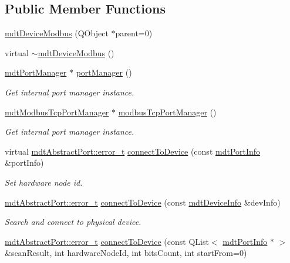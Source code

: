 \subsection*{Public Member Functions}
\begin{DoxyCompactItemize}
\item 
\hyperlink{classmdt_device_modbus_ac69cfbe26681342ba05672ab63de2a1f}{mdt\-Device\-Modbus} (Q\-Object $\ast$parent=0)
\item 
virtual \hyperlink{classmdt_device_modbus_a4696f2e3855917a3e3c02a822f9664e2}{$\sim$mdt\-Device\-Modbus} ()
\item 
\hyperlink{classmdt_port_manager}{mdt\-Port\-Manager} $\ast$ \hyperlink{classmdt_device_modbus_aed892b501f8cbd372ccfda1a4fafa536}{port\-Manager} ()
\begin{DoxyCompactList}\small\item\em Get internal port manager instance. \end{DoxyCompactList}\item 
\hyperlink{classmdt_modbus_tcp_port_manager}{mdt\-Modbus\-Tcp\-Port\-Manager} $\ast$ \hyperlink{classmdt_device_modbus_ac547788aa95d46c00ddb1342eb46ef93}{modbus\-Tcp\-Port\-Manager} ()
\begin{DoxyCompactList}\small\item\em Get internal port manager instance. \end{DoxyCompactList}\item 
virtual \hyperlink{classmdt_abstract_port_ad4121bb930c95887e77f8bafa065a85e}{mdt\-Abstract\-Port\-::error\-\_\-t} \hyperlink{classmdt_device_modbus_a3ca2a84163fed1380cbc8859a6b70db0}{connect\-To\-Device} (const \hyperlink{classmdt_port_info}{mdt\-Port\-Info} \&port\-Info)
\begin{DoxyCompactList}\small\item\em Set hardware node id. \end{DoxyCompactList}\item 
\hyperlink{classmdt_abstract_port_ad4121bb930c95887e77f8bafa065a85e}{mdt\-Abstract\-Port\-::error\-\_\-t} \hyperlink{classmdt_device_modbus_a093c6407ee69c4c7696a0c71d0acd88d}{connect\-To\-Device} (const \hyperlink{classmdt_device_info}{mdt\-Device\-Info} \&dev\-Info)
\begin{DoxyCompactList}\small\item\em Search and connect to physical device. \end{DoxyCompactList}\item 
\hyperlink{classmdt_abstract_port_ad4121bb930c95887e77f8bafa065a85e}{mdt\-Abstract\-Port\-::error\-\_\-t} \hyperlink{classmdt_device_modbus_a323b16687f448a4e45eb0b313635b77f}{connect\-To\-Device} (const Q\-List$<$ \hyperlink{classmdt_port_info}{mdt\-Port\-Info} $\ast$ $>$ \&scan\-Result, int hardware\-Node\-Id, int bits\-Count, int start\-From=0)

\end{DoxyCompactItemize}
